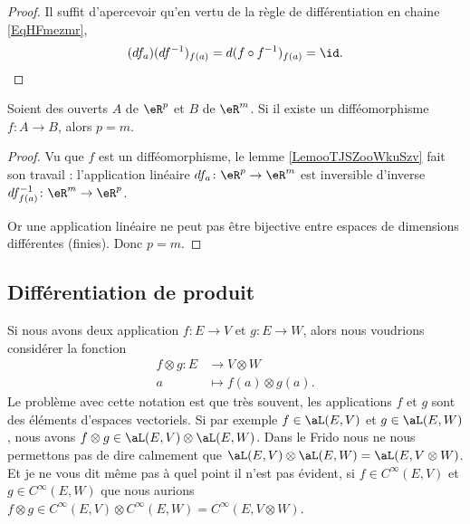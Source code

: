 \begin{proof}
	Il suffit d'apercevoir qu'en vertu de la règle de différentiation en chaine \eqref{EqHFmezmr},
	\begin{equation}
		(df_a)(df^{-1})_{f(a)}=d(f\circ f^{-1})_{f(a)}=\id.
	\end{equation}
\end{proof}

\begin{proposition}     \label{PROPooNONAooCyAtce}
	Soient des ouverts \( A\) de \( \eR^p\) et \( B\) de \( \eR^m\). Si il existe un difféomorphisme \( f\colon A\to B\), alors \( p=m\).
\end{proposition}

\begin{proof}
	Vu que \( f\) est un difféomorphisme, le lemme \ref{LemooTJSZooWkuSzv} fait son travail : l'application linéaire \( df_a\colon \eR^p\to \eR^m\) est inversible d'inverse \( df^{-1}_{f(a)}\colon \eR^m\to \eR^p\).

	Or une application linéaire ne peut pas être bijective entre espaces de dimensions différentes (finies). Donc \( p=m\).
\end{proof}

\subsection{Différentiation de produit}

Si nous avons deux application \( f\colon E\to V\) et \( g\colon E\to W\), alors nous voudrions considérer la fonction
\begin{equation}
	\begin{aligned}
		f\otimes g\colon E & \to V\otimes W            \\
		a                  & \mapsto f(a)\otimes g(a).
	\end{aligned}
\end{equation}
Le problème avec cette notation est que très souvent, les applications \( f\) et \( g\) sont des éléments d'espaces vectoriels. Si par exemple \( f\in \aL(E,V)\) et \( g\in \aL(E,W)\), nous avons \( f\otimes g\in \aL(E,V)\otimes \aL(E,W)\). Dans le Frido nous ne nous permettons pas de dire calmement que \( \aL(E,V)\otimes \aL(E,W)=\aL(E,V\otimes W)\). Et je ne vous dit même pas à quel point il n'est pas évident, si \( f\in C^{\infty}(E,V)\) et \( g\in  C^{\infty}(E,W)\) que nous aurions \( f\otimes g\in C^{\infty}(E,V)\otimes  C^{\infty}(E,W)= C^{\infty}(E,V\otimes W)\).

